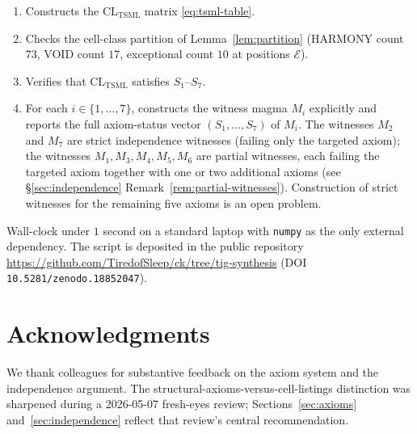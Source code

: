 \documentclass[11pt,reqno]{amsart}
\theoremstyle{plain}
\theoremstyle{definition}
\theoremstyle{remark}
\newcommand{\TSML}{\mathrm{TSML}}
\newcommand{\CL}{\mathrm{CL}}
\begin{document}
\begin{enumerate}
\item Constructs the $\CL_{\TSML}$ matrix \eqref{eq:tsml-table}.
\item Checks the cell-class partition of
Lemma~\ref{lem:partition} (HARMONY count $73$, VOID count $17$,
exceptional count $10$ at positions $\mathcal{E}$).
\item Verifies that $\CL_{\TSML}$ satisfies $S_{1}$--$S_{7}$.
\item For each $i \in \{1, \ldots, 7\}$, constructs the witness
magma $M_{i}$ explicitly and reports the full axiom-status vector
$(S_{1}, \ldots, S_{7})$ of $M_{i}$. The witnesses $M_{2}$ and
$M_{7}$ are strict independence witnesses (failing only the targeted
axiom); the witnesses $M_{1}, M_{3}, M_{4}, M_{5}, M_{6}$ are
partial witnesses, each failing the targeted axiom together with
one or two additional axioms (see §\ref{sec:independence}
Remark~\ref{rem:partial-witnesses}). Construction of strict
witnesses for the remaining five axioms is an open problem.
\end{enumerate}

Wall-clock under $1$ second on a standard laptop with
\texttt{numpy} as the only external dependency. The script is
deposited in the public repository
\url{https://github.com/TiredofSleep/ck/tree/tig-synthesis} (DOI
\texttt{10.5281/zenodo.18852047}).

\section*{Acknowledgments}
We thank colleagues for substantive feedback on the axiom system
and the independence argument. The structural-axioms-versus-cell-listings
distinction was sharpened during a 2026-05-07 fresh-eyes review;
Sections~\ref{sec:axioms} and~\ref{sec:independence} reflect that
review's central recommendation.
\end{document}
